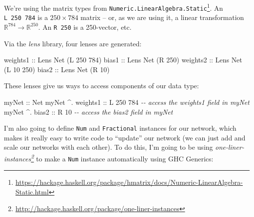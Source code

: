 \documentclass[]{article}
\newenvironment{Shaded}{}{}
\newcommand{\CommentTok}[1]{\textcolor[rgb]{0.38,0.63,0.69}{\textit{#1}}}
\newcommand{\DataTypeTok}[1]{\textcolor[rgb]{0.56,0.13,0.00}{#1}}
\newcommand{\DecValTok}[1]{\textcolor[rgb]{0.25,0.63,0.44}{#1}}
\newcommand{\NormalTok}[1]{#1}
\newcommand{\OperatorTok}[1]{\textcolor[rgb]{0.40,0.40,0.40}{#1}}
\newcommand{\OtherTok}[1]{\textcolor[rgb]{0.00,0.44,0.13}{#1}}
\renewcommand{\href}[2]{#2\footnote{\url{#1}}}
\begin{document}
We're using the matrix types from
\href{https://hackage.haskell.org/package/hmatrix/docs/Numeric-LinearAlgebra-Static.html}{\texttt{Numeric.LinearAlgebra.Static}}.
An \texttt{L\ 250\ 784} is a \(250 \times 784\) matrix -- or, as we are using
it, a linear transformation \(\mathbb{R}^{784} \rightarrow \mathbb{R}^{250}\).
An \texttt{R\ 250} is a 250-vector, etc.

Via the \emph{lens} library, four lenses are generated:

\begin{Shaded}
\begin{Highlighting}[]
\OtherTok{weights1 ::} \DataTypeTok{Lens\textquotesingle{}} \DataTypeTok{Net}\NormalTok{ (}\DataTypeTok{L} \DecValTok{250} \DecValTok{784}\NormalTok{)}
\OtherTok{bias1    ::} \DataTypeTok{Lens\textquotesingle{}} \DataTypeTok{Net}\NormalTok{ (}\DataTypeTok{R} \DecValTok{250}\NormalTok{)}
\OtherTok{weights2 ::} \DataTypeTok{Lens\textquotesingle{}} \DataTypeTok{Net}\NormalTok{ (}\DataTypeTok{L} \DecValTok{10}  \DecValTok{250}\NormalTok{)}
\OtherTok{bias2    ::} \DataTypeTok{Lens\textquotesingle{}} \DataTypeTok{Net}\NormalTok{ (}\DataTypeTok{R} \DecValTok{10}\NormalTok{)}
\end{Highlighting}
\end{Shaded}

These lenses give us ways to access components of our data type:

\begin{Shaded}
\begin{Highlighting}[]
\OtherTok{myNet             ::} \DataTypeTok{Net}
\NormalTok{myNet }\OperatorTok{\^{}.}\OtherTok{ weights1 ::} \DataTypeTok{L} \DecValTok{250} \DecValTok{784}  \CommentTok{{-}{-} access the weights1 field in myNet}
\NormalTok{myNet }\OperatorTok{\^{}.}\OtherTok{ bias2    ::} \DataTypeTok{R}  \DecValTok{10}      \CommentTok{{-}{-} access the bias2 field in myNet}
\end{Highlighting}
\end{Shaded}

I'm also going to define \texttt{Num} and \texttt{Fractional} instances for our
network, which makes it really easy to write code to ``update'' our network (we
can just add and scale our networks with each other). To do this, I'm going to
be using
\emph{\href{http://hackage.haskell.org/package/one-liner-instances}{one-liner-instances}}
to make a \texttt{Num} instance automatically using GHC Generics:
\end{document}
